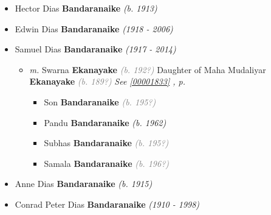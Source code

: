 \documentclass[10pt, openany]{book}
\begin{document}
\begin{itemize}
{\begin{itemize}
{\begin{itemize}
{\begin{itemize}
{\begin{itemize}
{\begin{itemize}
{\begin{itemize}
{\begin{itemize}
\item{Asoka \textbf{Obeyesekere} \textcolor{gray}{\textit{(b. 197?)}}
 }
\item{Anouk \textbf{Obeyesekere} \textcolor{gray}{\textit{(b. 197?)}}
 }
\item{Hasha \textbf{Obeyesekere} \textcolor{gray}{\textit{(b. 198?)}}
 }
\end{itemize}}
\end{itemize}
 }
\end{itemize}}
\end{itemize}
   }
\item{Hector Dias \textbf{Bandaranaike} \textcolor{slorange}{\textit{(b. 1913)}}
  }
\item{Edwin Dias \textbf{Bandaranaike} \textcolor{slorange}{\textit{(1918 - 2006)}}
  }
\item{Samuel Dias \textbf{Bandaranaike} \textcolor{slorange}{\textit{(1917 - 2014)}}
\begin{itemize}
\item{\textit{m.} Swarna \textbf{Ekanayake} \textcolor{gray}{\textit{(b. 192?)}} Daughter of  Maha Mudaliyar \textbf{Ekanayake} \textcolor{gray}{\textit{(b. 189?)}} \textcolor{slteal}{\textit{See  \autoref{00001833} \textit{, p. \pageref{00001833} }}}   \label{couple:00001831:00001832} \begin{itemize}
\item{Son \textbf{Bandaranaike} \textcolor{gray}{\textit{(b. 195?)}}
 }
\item{Pandu \textbf{Bandaranaike} \textcolor{slorange}{\textit{(b. 1962)}}
 }
\item{Subhas \textbf{Bandaranaike} \textcolor{gray}{\textit{(b. 195?)}}
 }
\item{Samala \textbf{Bandaranaike} \textcolor{gray}{\textit{(b. 196?)}}
 }
\end{itemize}}
\end{itemize}
  }
\item{Anne Dias \textbf{Bandaranaike} \textcolor{slorange}{\textit{(b. 1915)}}
  }
\item{Conrad Peter Dias \textbf{Bandaranaike} \textcolor{slorange}{\textit{(1910 - 1998)}}
}
\end{itemize}}
\end{itemize}}
\end{itemize}}
\end{itemize}
\end{document}
